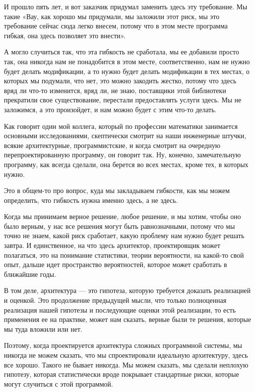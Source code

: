 И прошло пять лет, и вот заказчик придумал заменить здесь эту требование. Мы такие «Вау, как хорошо мы придумали, мы заложили этот риск, мы это требование сейчас сюда легко внесем, потому что в этом месте программа гибкая, она здесь позволяет это внести».

А могло случиться так, что эта гибкость не сработала, мы ее добавили просто так, она никогда нам не понадобится в этом месте, соответственно, нам не нужно будет делать модификации, а то нужно будет делать модификации в тех местах, о которых мы подумали, что нет, это можно закодить жестко, потому что здесь вряд ли что-то изменится, вряд ли, не знаю, поставщики этой библиотеки прекратили свое существование, перестали предоставлять услуги здесь. Мы не заложимся, а это произойдет, и нам можно будет с этим что-то делать. 

Как говорит один мой коллега, который по профессии математики занимается основными исследованиями, скептически смотрит на наши инженерные штучки, всякие архитектурные, программистские, и когда смотрит на очередную перепроектированную программу, он говорит так. Ну, конечно, замечательную программу, как всегда сделали, она берется во всех местах, кроме тех, в которых нужно.

Это в общем-то про вопрос, куда мы закладываем гибкости, как мы можем определить, что гибкость нужна именно здесь, а не здесь.

Когда мы принимаем верное решение, любое решение, и мы хотим, чтобы оно было верным, у нас все решения могут быть равнозначными, потому что мы точно не знаем, какой риск сработает, какую проблему нам нужно будет решать завтра. И единственное, на что здесь архитектор, проектировщик может полагаться, это на понимание статистики, теории вероятности, на какой-то свой опыт, дальше идет пространство вероятностей, которое может сработать в ближайшие годы.

В том деле, архитектура --- это гипотеза, которую требуется доказать реализацией и оценкой. Это продолжение предыдущей мысли, что только полноценная реализация нашей гипотезы и последующие оценки этой реализации, то есть применения ее на практике, может нам сказать, верные были те решения, которые мы туда вложили или нет.

Поэтому, когда проектируется архитектура сложных программной системы, мы никогда не можем сказать, что мы спроектировали идеальную архитектуру, здесь все хорошо. Такого не бывает никогда. Мы можем сказать, мы сделали неплохую гипотезу, которая статистически вроде покрывает стандартные риски, которые могут случиться с этой программой.

